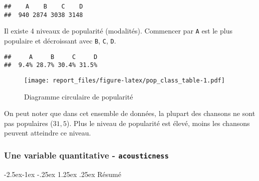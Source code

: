 \documentclass[
  12pt,
]{article}
\makeatletter
\newenvironment{Shaded}{\begin{snugshade}}{\end{snugshade}}
\newcommand{\AttributeTok}[1]{\textcolor[rgb]{0.77,0.63,0.00}{#1}}
\newcommand{\ConstantTok}[1]{\textcolor[rgb]{0.00,0.00,0.00}{#1}}
\newcommand{\FunctionTok}[1]{\textcolor[rgb]{0.00,0.00,0.00}{#1}}
\newcommand{\NormalTok}[1]{#1}
\newcommand{\OtherTok}[1]{\textcolor[rgb]{0.56,0.35,0.01}{#1}}
\newcommand{\SpecialCharTok}[1]{\textcolor[rgb]{0.00,0.00,0.00}{#1}}
\renewcommand\paragraph{\@startsection{paragraph}{4}{\z@}%
        {-2.5ex\@plus -1ex \@minus -.25ex}%
        {1.25ex \@plus .25ex}%
        {\normalfont\normalsize\bfseries}}
\makeatother
\begin{document}
\begin{verbatim}
##    A    B    C    D 
##  940 2874 3038 3148
\end{verbatim}

Il existe 4 niveaux de popularité (modalités). Commencer par \texttt{A}
est le plus populaire et décroissant avec \texttt{B}, \texttt{C},
\texttt{D}.

\begin{Shaded}
\end{Shaded}

\begin{verbatim}
##     A     B     C     D 
##  9.4% 28.7% 30.4% 31.5%
\end{verbatim}

\begin{figure}
\centering
\texttt{[image: report\_files/figure-latex/pop\_class\_table-1.pdf]}
\caption{Diagramme circulaire de popularité}
\end{figure}

On peut noter que dans cet ensemble de données, la plupart des chansons
ne sont pas populaires (\(31,5%
\)). Plus le niveau de popularité est élevé, moins les chansons peuvent
atteindre ce niveau.

\hypertarget{une-variable-quantitative---acousticness}{%
\subsubsection{\texorpdfstring{Une variable quantitative -
\texttt{acousticness}}{Une variable quantitative - acousticness}}\label{une-variable-quantitative---acousticness}}

\hypertarget{ruxe9sumuxe9}{%
\paragraph{Résumé}\label{ruxe9sumuxe9}}

\begin{Shaded}
\end{Shaded}
\end{document}
